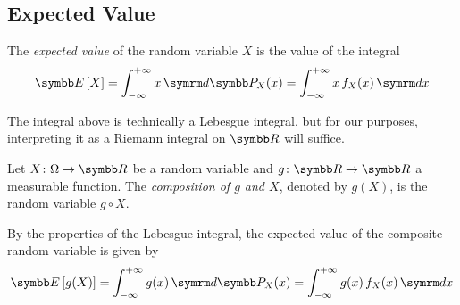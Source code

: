 \subsection*{Expected Value}

\begin{definition}
The \emph{expected value} of the random variable \(X\) is the value of the integral
\[
    \expectedvalue\left[X\right] = \int_{-\infty}^{+\infty} x \diff \probability_X (x) = \int_{-\infty}^{+\infty} x \, f_X (x) \diff x
\]
\end{definition}

\begin{remark*}
The integral above is technically a Lebesgue integral, but for our purposes, interpreting it as a Riemann integral on \(\reals\) will suffice.
\end{remark*}

\begin{definition}
Let \(X \colon \Omega \to \reals\) be a random variable and \(g \colon \reals \to \reals\) a measurable function. The \emph{composition of \(g\) and \(X\)}, denoted by \(g(X)\), is the random variable \(g \circ X\).
\end{definition}

\begin{remark*}
By the properties of the Lebesgue integral, the expected value of the composite random variable is given by
\[
    \expectedvalue\left[g(X)\right] = \int_{-\infty}^{+\infty} g(x) \diff \probability_X (x) = \int_{-\infty}^{+\infty} g(x) \, f_{X} (x) \diff x
\]
\end{remark*}

